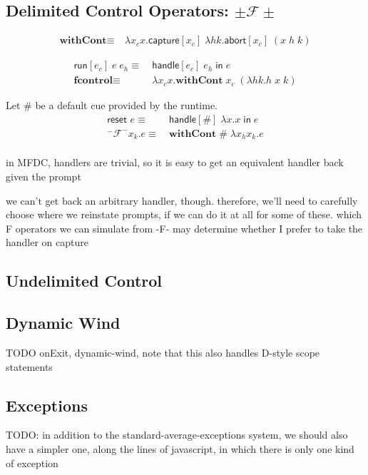 \documentclass[11pt]{article}
\newcommand{\handle}[3]{\textsf{handle}[#1]\;#2\;\textsf{in}\;#3}
\newcommand{\abort}[2]{\textsf{abort}[#1]\;#2}
\newcommand{\capture}[2]{\textsf{capture}[#1]\;#2}
\newcommand{\letin}[2]{\textsf{let }#1\textsf{ in }#2}
\newcommand{\withCont}[2]{\textsf{withCont}[#1]\;#2}
\newcommand\F{\mathcal{F}}
\begin{document}
\subsection{Delimited Control Operators: $\pm\mathcal{F}\pm$}

\begin{align*}
\textbf{withCont} \equiv\ &\lambda x_cx. \capture{x_c}{\lambda hk. \abort{x_c}{(x\;h\;k)}}
\end{align*}

\begin{align*}
\textsf{run}[e_c]\;e\;e_h \equiv\ &\handle{e_c}{e_h}{e} \\
\textbf{fcontrol} \equiv\ &\lambda x_cx. \textbf{withCont}\;x_c\;(\lambda hk.h\;x\;k)
%
\end{align*}

Let $\#$ be a default cue provided by the runtime.
\begin{align*}
\textsf{reset }e \equiv\ &\handle{\#}{\lambda x. x}{e} \\
^-\F^- x_k.e \equiv\ &\textbf{withCont}\;\#\;\lambda x_hx_k.e \\
\end{align*}



in MFDC, handlers are trivial, so it is easy to get an equivalent handler back given the prompt

we can't get back an arbitrary handler, though. therefore, we'll need to carefully choose where we reinstate prompts, if we can do it at all for some of these. which F operators we can simulate from -F- may determine whether I prefer to take the handler on capture

\subsection{Undelimited Control}

\subsection{Dynamic Wind}

TODO onExit, dynamic-wind, note that this also handles D-style scope statements

\subsection{Exceptions}
TODO: in addition to the standard-average-exceptions system, we should also have a simpler one, along the lines of javascript, in which there is only one kind of exception
\end{document}
